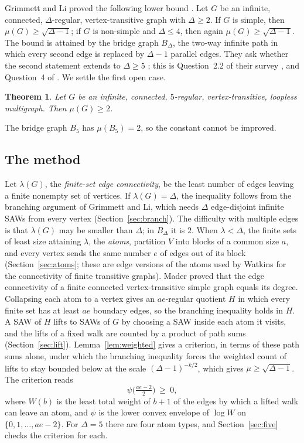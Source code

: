 \documentclass[11pt]{amsart}
\newtheorem{theorem}{Theorem}[section]
\theoremstyle{remark}
\begin{document}
Grimmett and Li proved the following lower bound \cite[Theorem~4.1]{GL15}. Let $G$ be an infinite, connected,
$\Delta$-regular, vertex-transitive graph with $\Delta\ge2$. If $G$ is simple, then $\mu(G)\ge\sqrt{\Delta-1}$;
if $G$ is non-simple and $\Delta\le4$, then again $\mu(G)\ge\sqrt{\Delta-1}$. The bound is attained by the bridge
graph $B_\Delta$, the two-way infinite path in which every second edge is replaced by $\Delta-1$ parallel edges. They
ask whether the second statement extends to $\Delta\ge5$ \cite{GL15}; this is Question~2.2 of their survey
\cite{GL19}, and Question~4 of \cite{GL13}. We settle the first open case.

\begin{theorem}\label{thm:main}
Let $G$ be an infinite, connected, $5$-regular, vertex-transitive, loopless multigraph. Then $\mu(G)\ge2$.
\end{theorem}

The bridge graph $B_5$ has $\mu(B_5)=2$, so the constant cannot be improved.

\subsection*{The method}
Let $\lambda(G)$, the \emph{finite-set edge connectivity}, be the least number of edges leaving a finite nonempty set
of vertices. If $\lambda(G)=\Delta$,
the inequality follows from the branching argument of Grimmett and Li, which needs $\Delta$ edge-disjoint infinite
SAWs from every vertex (Section~\ref{sec:branch}). The difficulty with multiple edges is that $\lambda(G)$ may be
smaller than $\Delta$; in $B_\Delta$ it is $2$. When $\lambda<\Delta$, the finite sets of least size attaining
$\lambda$, the \emph{atoms}, partition $V$ into blocks of a common size $a$, and every vertex sends the same number $e$
of edges out of its block (Section~\ref{sec:atoms}; these are edge versions of the atoms used by Watkins \cite{Wat70} for the
connectivity of finite transitive graphs). Mader \cite{Mad71} proved that the edge connectivity of a finite connected
vertex-transitive simple graph equals its degree. Collapsing each atom to a vertex gives an $ae$-regular quotient
$H$ in which every finite set has at least $ae$ boundary edges, so the branching inequality holds in $H$. A SAW of $H$
lifts to SAWs of $G$ by choosing a SAW inside each atom it visits, and the lifts of a fixed walk are counted by a
product of path sums (Section~\ref{sec:lift}). Lemma~\ref{lem:weighted} gives a criterion, in terms of these path sums
alone, under which the branching inequality forces the weighted count of lifts to stay bounded below at the scale
$(\Delta-1)^{-k/2}$, which gives $\mu\ge\sqrt{\Delta-1}$. The criterion reads
\[
\psi\bigl(\tfrac{ae-2}2\bigr)\ \ge\ 0,
\]
where $W(b)$ is the least total weight of $b+1$ of the edges by which a lifted walk can leave an atom, and $\psi$ is
the lower convex envelope of $\log W$ on $\{0,1,\dots,ae-2\}$. For $\Delta=5$ there are four atom types, and
Section~\ref{sec:five} checks the criterion for each.
\end{document}
